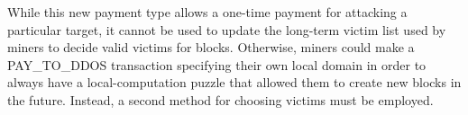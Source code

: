 


%

While this new payment type allows a one-time payment for attacking a particular
target, it cannot be used to update the long-term victim list used by miners to
decide valid victims for blocks. Otherwise, miners could make a PAY\_TO\_DDOS
transaction specifying their own local domain in order to always have a
local-computation puzzle that allowed them to create new blocks in the future.
Instead, a second method for choosing victims must be employed.

%

